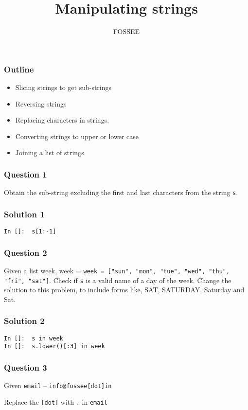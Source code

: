 \documentclass[presentation]{beamer}
\title{Manipulating strings}
\author{FOSSEE}
\date{}
\begin{document}
\maketitle









\begin{frame}
\frametitle{Outline}
\label{sec-1}

\begin{itemize}
\item Slicing strings to get sub-strings
\item Reversing strings
\item Replacing characters in strings.
\item Converting strings to upper or lower case
\item Joining a list of strings
\end{itemize}
\end{frame}
\begin{frame}
\frametitle{Question 1}
\label{sec-2}

  Obtain the sub-string excluding the first and last characters from
  the string \texttt{s}.
\end{frame}
\begin{frame}[fragile]
\frametitle{Solution 1}
\label{sec-3}

\begin{verbatim}
In []:  s[1:-1]
\end{verbatim}
\end{frame}
\begin{frame}
\frametitle{Question 2}
\label{sec-4}

  Given a list week, week = \texttt{week = ["sun", "mon", "tue", "wed",   "thu", "fri", "sat"]}. Check if \texttt{s} is a valid name of a day of the
  week. Change the solution to this problem, to include forms like,
  SAT, SATURDAY, Saturday and Sat.
\end{frame}
\begin{frame}[fragile]
\frametitle{Solution 2}
\label{sec-5}

\begin{verbatim}
In []:  s in week
In []:  s.lower()[:3] in week
\end{verbatim}
\end{frame}
\begin{frame}
\frametitle{Question 3}
\label{sec-6}

  Given \texttt{email} -- \texttt{info@fossee[dot]in}

  Replace the \texttt{[dot]} with \texttt{.} in \texttt{email}
\end{frame}
\end{document}
